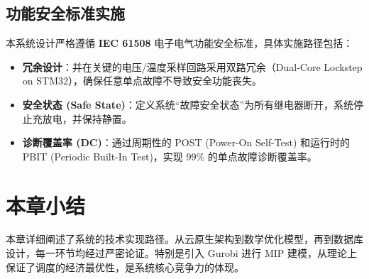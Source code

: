 \subsection{功能安全标准实施}

本系统设计严格遵循 \textbf{IEC 61508} 电子电气功能安全标准，具体实施路径包括：

\begin{itemize}
    \item \textbf{冗余设计}：并在关键的电压/温度采样回路采用双路冗余（Dual-Core Lockstep on STM32），确保任意单点故障不导致安全功能丧失。
    \item \textbf{安全状态 (Safe State)}：定义系统“故障安全状态”为所有继电器断开，系统停止充放电，并保持静置。
    \item \textbf{诊断覆盖率 (DC)}：通过周期性的 POST (Power-On Self-Test) 和运行时的 PBIT (Periodic Built-In Test)，实现 99\% 的单点故障诊断覆盖率。
\end{itemize}

\section{本章小结}
本章详细阐述了系统的技术实现路径。从云原生架构到数学优化模型，再到数据库设计，每一环节均经过严密论证。特别是引入 Gurobi 进行 MIP 建模，从理论上保证了调度的经济最优性，是系统核心竞争力的体现。
